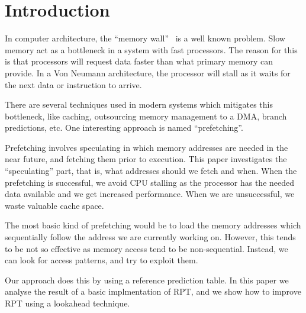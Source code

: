 \section{Introduction} %


In computer architecture, the ``memory wall''~\cite{wulf_mckee_1995}
is a well known problem. Slow memory act as a bottleneck in a system
with fast processors. The reason for this is that processors will
request data faster than what primary memory can provide. In a Von
Neumann architecture, the processor
will stall as it waits for the next data or instruction to arrive.

There are several techniques used in modern systems which mitigates
this bottleneck, like caching, outsourcing memory management to a DMA,
branch predictions, etc. One interesting approach is named
``prefetching''.

Prefetching involves speculating in which memory
addresses are needed in the near future, and fetching them prior to
execution. This paper investigates the ``speculating'' part, that is,
what addresses should we fetch and when. When the prefetching is
successful, we avoid CPU stalling as the processor has the needed data
available and we get increased performance. When we are unsuccessful,
we waste valuable cache space.

The most basic kind of prefetching would be to load the memory
addresses which sequentially follow the address we are currently
working on. However, this tends to be not so effective as memory
access tend to be non-sequential. Instead, we can look for access
patterns, and try to exploit them.

Our approach does this by using a reference prediction table.
In this paper we analyse the result of a basic implmentation of RPT,
and we show how to improve RPT using a lookahead technique.


